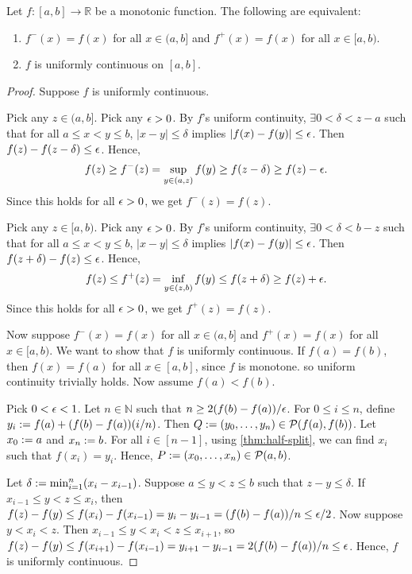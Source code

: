 \documentclass[a4paper,12pt,fleqn]{article}
\begin{document}
\begin{lemma}
\label{thm:monotone-ucont-iff-cont}
Let $f: [a, b] \to \mathbb{R}$ be a monotonic function.
The following are equivalent:
\begin{enumerate}
\item $f^-(x) = f(x)$ for all $x \in (a, b]$ and $f^+(x) = f(x)$ for all $x \in [a, b)$.
\item $f$ is uniformly continuous on $[a, b]$.
\end{enumerate}
\end{lemma}
\begin{proof}
Suppose $f$ is uniformly continuous.

Pick any $z \in (a, b]$. Pick any $\epsilon > 0$.
By $f$'s uniform continuity, $\exists 0 < \delta < z-a$ such that
for all $a \le x < y \le b$, $|x-y| \le \delta$ implies $|f(x)-f(y)| \le \epsilon$.
Then $f(z) - f(z-\delta) \le \epsilon$. Hence,
\[ f(z) \ge f^-(z) = \sup_{y \in (a, z)} f(y) \ge f(z-\delta) \ge f(z) - \epsilon. \]
Since this holds for all $\epsilon > 0$, we get $f^-(z) = f(z)$.

Pick any $z \in [a, b)$. Pick any $\epsilon > 0$.
By $f$'s uniform continuity, $\exists 0 < \delta < b-z$ such that
for all $a \le x < y \le b$, $|x-y| \le \delta$ implies $|f(x)-f(y)| \le \epsilon$.
Then $f(z+\delta) - f(z) \le \epsilon$. Hence,
\[ f(z) \le f^+(z) = \inf_{y \in (z, b)} f(y) \le f(z+\delta) \ge f(z) + \epsilon. \]
Since this holds for all $\epsilon > 0$, we get $f^+(z) = f(z)$.

Now suppose $f^-(x) = f(x)$ for all $x \in (a, b]$ and $f^+(x) = f(x)$ for all $x \in [a, b)$.
We want to show that $f$ is uniformly continuous.
If $f(a) = f(b)$, then $f(x) = f(a)$ for all $x \in [a, b]$, since $f$ is monotone.
so uniform continuity trivially holds. Now assume $f(a) < f(b)$.

Pick $0 < \epsilon < 1$. Let $n \in \mathbb{N}$ such that $n \ge 2(f(b)-f(a))/\epsilon$.
For $0 \le i \le n$, define $y_i := f(a) + (f(b)-f(a))(i/n)$.
Then $Q := (y_0, \ldots, y_n) \in \mathcal{P}(f(a), f(b))$.
Let $x_0 := a$ and $x_n := b$.
For all $i \in [n-1]$, using \cref{thm:half-split},
we can find $x_i$ such that $f(x_i) = y_i$.
Hence, $P := (x_0, \ldots, x_n) \in \mathcal{P}(a, b)$.

Let $\delta := \min_{i=1}^n (x_i - x_{i-1})$.
Suppose $a \le y < z \le b$ such that $z - y \le \delta$.
If $x_{i-1} \le y < z \le x_i$, then
$f(z) - f(y) \le f(x_i) - f(x_{i-1}) = y_i - y_{i-1} = (f(b)-f(a))/n \le \epsilon/2$.
Now suppose $y < x_i < z$. Then $x_{i-1} \le y < x_i < z \le x_{i+1}$, so
$f(z) - f(y) \le f(x_{i+1}) - f(x_{i-1}) = y_{i+1} - y_{i-1} = 2(f(b)-f(a))/n \le \epsilon$.
Hence, $f$ is uniformly continuous.
\end{proof}
\end{document}
